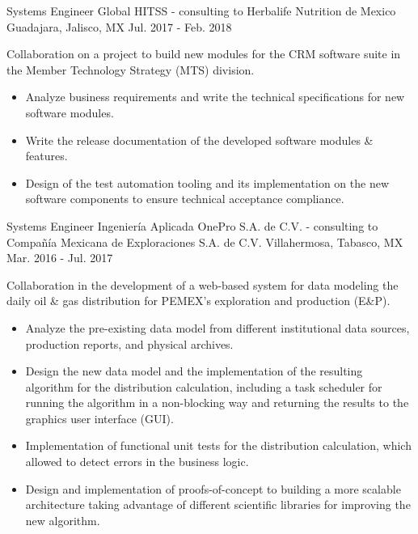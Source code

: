 \begin{cventries}
	\cventry
	{Systems Engineer} %
	{Global HITSS - consulting to Herbalife Nutrition de Mexico} %
	{Guadajara, Jalisco, MX} %
	{Jul. 2017 - Feb. 2018} %
	{ %
		\begin{cvitems}
			\item {Collaboration on a project to build new modules for the CRM software suite in the Member Technology Strategy (MTS) division.}
			\begin{itemize}
				\item {Analyze business requirements and write the technical specifications for new software modules.}
				\item {Write the release documentation of the developed software modules \& features.}
				\item {Design of the test automation tooling and its implementation on the new software components to ensure technical acceptance compliance.}
			\end{itemize}
		\end{cvitems}
	}
	


\cventry
{Systems Engineer} %
{Ingeniería Aplicada OnePro S.A. de C.V. - consulting to Compañía Mexicana de Exploraciones S.A. de C.V.} %
{Villahermosa, Tabasco, MX} %
{Mar. 2016 - Jul. 2017} %
{ %
	\begin{cvitems}
		\item {Collaboration in the development of a web-based system for data modeling the daily oil \& gas distribution for PEMEX's exploration and production (E\&P).}
		\begin{itemize}
			\item {Analyze the pre-existing data model from different institutional data sources, production reports, and physical archives.}
			\item {Design the new data model and the implementation of the resulting algorithm for the distribution calculation, including a task scheduler for running the algorithm in a non-blocking way and returning the results to the graphics user interface (GUI).}
			\item {Implementation of functional unit tests for the distribution calculation, which allowed to detect errors in the business logic.}
			\item {Design and implementation of proofs-of-concept to building a more scalable architecture taking advantage of different scientific libraries for improving the new algorithm.}
		\end{itemize}
	\end{cvitems}
}


\end{cventries}
